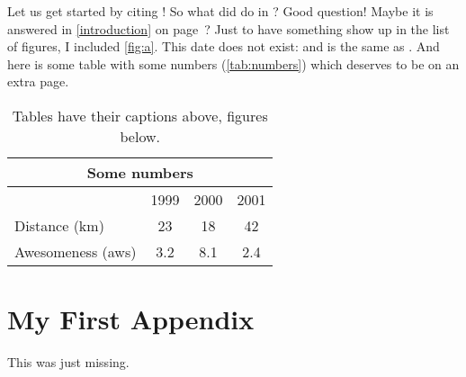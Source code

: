 \documentclass[german,bachelor]{swsLeipzig}
\begin{document}
Let us get started by citing \citet{manning:1999}!
So what did \citeauthor{manning:1999} do in \citeyear{manning:1999}?
Good question!
Maybe it is answered in \autoref{introduction} on page~\pageref{introduction}?
Just to have something show up in the list of figures, I included \autoref{fig:a}.
This date does not exist: 
and is the same as .
And here is some table with some numbers (\autoref{tab:numbers})
which deserves to be on an extra page.
\begin{table}[p]%
  \caption{Tables have their captions above, figures below.}
  \begin{center}
    \begin{tabular}{lccc}\toprule
      \multicolumn{4}{c}{Some numbers}\\\midrule
      & 1999 & 2000 & 2001 \\\cmidrule(l){2-4}
      Distance (km) & 23 & 18 & 42 \\
      Awesomeness (aws) & 3.2 & 8.1 & 2.4 \\\bottomrule
    \end{tabular}
  \end{center}\label{tab:numbers}%
\end{table}

\appendix
\chapter{My First Appendix}
This was just missing.

\end{document}

